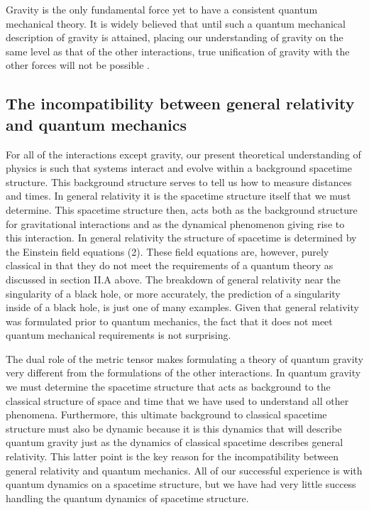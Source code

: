 \documentclass[aps,amssymb,12pt]{revtex4-2}
\begin{document}
Gravity is the only fundamental force yet to have a consistent quantum
mechanical theory. It is widely believed that until such a quantum
mechanical description of gravity is attained, placing our understanding of
gravity on the same level as that of the other interactions, true
unification of gravity with the other forces will not be possible \cite{8}.

\subsection{The incompatibility between general relativity and quantum
mechanics}

For all of the interactions except gravity, our present theoretical
understanding of physics is such that systems interact and evolve within a
background spacetime structure. This background structure serves to tell us
how to measure distances and times. In general relativity it is the
spacetime structure itself that we must determine. This spacetime structure
then, acts both as the background structure for gravitational interactions
and as the dynamical phenomenon giving rise to this interaction. In general
relativity the structure of spacetime is determined by the Einstein field
equations (2). These field equations are, however, purely classical in that
they do not meet the requirements of a quantum theory as discussed in
section II.A above. The breakdown of general relativity near the singularity
of a black hole, or more accurately, the prediction of a singularity inside
of a black hole, is just one of many examples. Given that general relativity
was formulated prior to quantum mechanics, the fact that it does not meet
quantum mechanical requirements is not surprising.

The dual role of the metric tensor makes formulating a theory of quantum
gravity very different from the formulations of the other interactions. In
quantum gravity we must determine the spacetime structure that acts as
background to the classical structure of space and time that we have used to
understand all other phenomena. Furthermore, this ultimate background to
classical spacetime structure must also be dynamic because it is this
dynamics that will describe quantum gravity just as the dynamics of
classical spacetime describes general relativity. This latter point is the
key reason for the incompatibility between general relativity and quantum
mechanics. All of our successful experience is with quantum dynamics on a
spacetime structure, but we have had very little success handling the
quantum dynamics of spacetime structure.
\end{document}
